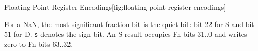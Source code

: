 \begin{manuallistedformatdiagram}{Floating-Point Register Encodings}[fig:floating-point-register-encodings]
\end{manuallistedformatdiagram}
{\small
For a NaN, the most significant fraction bit is the quiet bit: bit 22 for S and bit 51 for D.
\texttt{s} denotes the sign bit. An S result occupies Fn bits 31..0 and writes zero to Fn bits 63..32.
\par}
